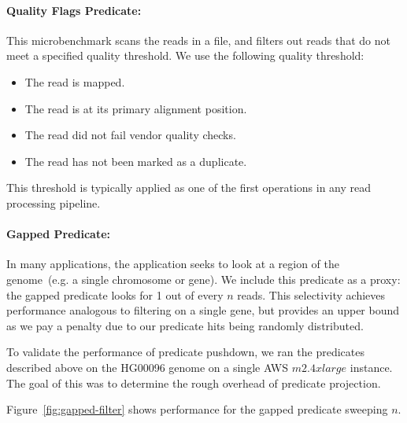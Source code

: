 \documentclass[10pt,twocolumn]{article}
\theoremstyle{plain}
\begin{document}
\paragraph{Quality Flags Predicate:}
\label{sec:quality-flags-predicate}

This microbenchmark scans the reads in a file, and filters out reads that do not meet a specified quality threshold. We use the following
quality threshold:

\begin{itemize}
\item The read is mapped.
\item The read is at its primary alignment position.
\item The read did not fail vendor quality checks.
\item The read has not been marked as a duplicate.
\end{itemize}
This threshold is typically applied as one of the first operations in any read processing pipeline.

\paragraph{Gapped Predicate:}
\label{sec:gapped-predicate}

In many applications, the application seeks to look at a region of the genome~(e.g. a single chromosome or gene). We include this
predicate as a proxy: the gapped predicate looks for 1 out of every $n$ reads. This selectivity achieves performance analogous to filtering
on a single gene, but provides an upper bound as we pay a penalty due to our predicate hits being randomly distributed.

To validate the performance of predicate pushdown, we ran the predicates described above on the HG00096 genome on a
single AWS $m2.4xlarge$ instance. The goal of this was to determine the rough overhead of predicate projection.

Figure~\ref{fig:gapped-filter} shows performance for the gapped predicate sweeping $n$.
\end{document}
